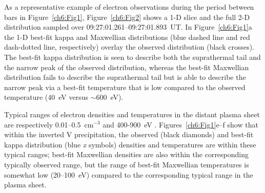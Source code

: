   \begin{figure}
    \centering {}
  \end{figure}


  As a representative example of electron observations during the period between
  bars in Figure~\ref{ch6:Fig1}, Figure~\ref{ch6:Fig2} shows a 1-D slice and the
  full 2-D distribution sampled over 09:27:01.261--09:27:01.893~UT. In
  Figure~\ref{ch6:Fig1}a the 1-D best-fit kappa and Maxwellian distributions
  (blue dashed line and red dash-dotted line, respectively) overlay the observed
  distribution (black crosses). The best-fit kappa distribution is seen to
  describe both the suprathermal tail and the narrow peak of the observed
  distribution, whereas the best-fit Maxwellian distribution fails to describe
  the suprathermal tail but is able to describe the narrow peak via a best-fit
  temperature that is low compared to the observed temperature (40~eV versus
  $\sim$600~eV).

  Typical ranges of electron densities and temperatures in the distant plasma
  sheet are respectively 0.01--0.5~cm$^{-3}$ and 400-900~eV
  \citep{Kletzing2003,Paschmann2003}. Figures~\ref{ch6:Fig1}e--f show that
  within the inverted V precipitation, the observed (black diamonds) and
  best-fit kappa distribution (blue \emph{x} symbols) densities and temperatures
  are within these typical ranges; best-fit Maxwellian densities are also within
  the corresponding typically observed range, but the range of best-fit
  Maxwellian temperatures is somewhat low (20--100~eV) compared to the
  corresponding typical range in the plasma sheet.

